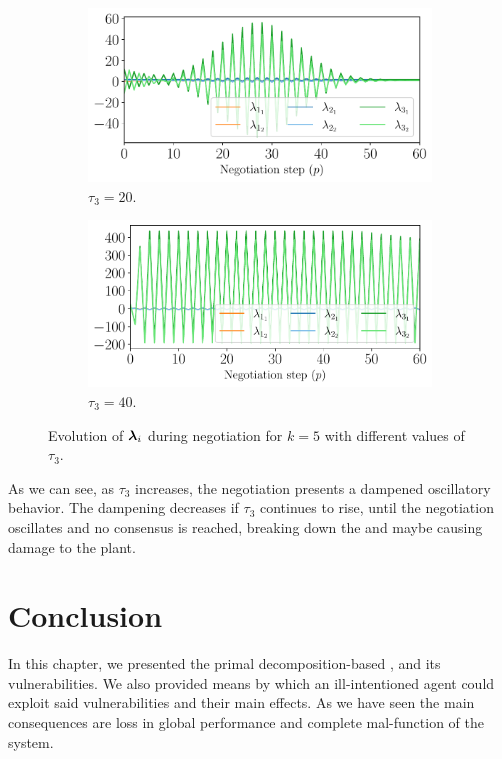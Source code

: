\documentclass[../main.tex]{subfiles}
\begin{document}
\begin{figure}[h]
  \\~\\
  \begin{subfigure}{0.45\textwidth}
    \includegraphics[width=\textwidth]{../img/example_primal_decomposition/example_vary_tau_lambda_tau_20.0.pdf}
    \caption{$\tau_{3}=20$.}\label{fig:example_vary_tau_lambda_tau_20}
  \end{subfigure}
  \begin{subfigure}{0.45\textwidth}
    \includegraphics[width=\textwidth]{../img/example_primal_decomposition/example_vary_tau_lambda_tau_40.0.pdf}
    \caption{$\tau_{3}=40$.}\label{fig:example_vary_tau_lambda_tau_40}
  \end{subfigure}
    \caption{Evolution of $\boldsymbol{\lambda}_i$ during negotiation for $k=5$ with different values of $\tau_{3}$.}\label{fig:example_vary_tau_lambda}
\end{figure}
As we can see, as $\tau_{3}$ increases, the negotiation presents a dampened oscillatory behavior.
The dampening decreases if $\tau_{3}$ continues to rise, until the negotiation oscillates and no consensus is reached, breaking down the \dmpc{} and maybe causing damage to the plant.

\section{Conclusion}\label{sec:conclusion}
In this chapter, we presented the primal decomposition-based \dmpc{}, and its vulnerabilities.
We also provided means by which an ill-intentioned agent could exploit said vulnerabilities and their main effects.
As we have seen the main consequences are loss in global performance and complete mal-function of the system.
\end{document}

